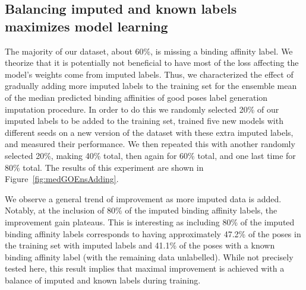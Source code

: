 \documentclass[journal=jmcmar,manuscript=article]{achemso}
\begin{document}
\subsection{Balancing imputed and known labels maximizes model learning}
The majority of our dataset, about 60\%, is missing a binding affinity label.
We theorize that it is potentially not beneficial to have most of the loss affecting the model's weights come from imputed labels.
Thus, we characterized the effect of gradually adding more imputed labels to the training set for the ensemble mean of the median predicted binding affinities of good poses label generation imputation procedure.
In order to do this we randomly selected 20\% of our imputed labels to be added to the training set, trained five new models with different seeds on a new version of the dataset with these extra imputed labels, and measured their performance.
We then repeated this with another randomly selected 20\%, making 40\% total, then again for 60\% total, and one last time for 80\% total.
The results of this experiment are shown in Figure~\ref{fig:medGOEnsAdding}.

We observe a general trend of improvement as more imputed data is added.
Notably, at the inclusion of 80\% of the imputed binding affinity labels, the improvement gain plateaus.
This is interesting as including 80\% of the imputed binding affinity labels corresponds to having approximately 47.2\% of the poses in the training set with imputed labels and 41.1\% of the poses with a known binding affinity label (with the remaining data unlabelled).
While not precisely tested here, this result implies that maximal improvement is achieved with a balance of imputed and known labels during training.
\end{document}
